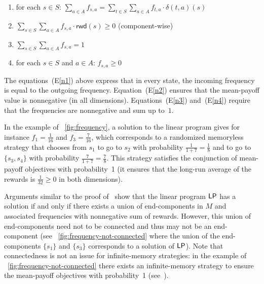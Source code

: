 \documentclass{article}
\newcommand{\PP}{\delta}
\newcommand{\LP}{{\sf LP}}
\newcommand{\rwd}{\mathsf{rwd}}
\begin{document}
\renewcommand{\theenumi}{(\arabic{enumi})}
\begin{enumerate}[(E1)]
\item for each $s \in S$: $\sum_{a \in A} f_{s,a} = \sum_{t \in S} \sum_{a \in A} f_{t,a} \cdot \PP(t,a)(s)$ \label{n1} \\[-6pt]

\item $\sum_{s \in S} \sum_{a \in A} f_{s,a} \cdot \rwd(s) \geq 0$ (component-wise) \label{n2} \\[-6pt]

\item $\sum_{s \in S} \sum_{a \in A} f_{s,a} = 1$ \label{n3} \\[-6pt]

\item for each $s \in S$ and $a \in A$: $f_{s,a} \geq 0$ \label{n4} 

\end{enumerate}
\renewcommand{\theenumi}{\arabic{enumi}}
The equations~(E\ref{n1}) above express that in every state, the incoming frequency is
equal to the outgoing frequency. Equation~(E\ref{n2}) ensures that the mean-payoff
value is nonnegative (in all dimensions). Equations~(E\ref{n3}) and~(E\ref{n4}) 
require that the frequencies are nonnegative and sum up to~$1$.

\smallskip{}
In the example of \figurename~\ref{fig:frequency}, a solution to the linear program 
gives for instance $f_1 = \frac{1}{16}$ and $f_3 = \frac{7}{16}$, which corresponds
to a randomized memoryless strategy that chooses from $s_1$ to go to $s_2$ with 
probability $\frac{1}{1+7} = \frac{1}{8}$ and to go to $\{s_3,s_4\}$ with probability
$\frac{7}{1+7} = \frac{7}{8}$. This strategy satisfies the conjunction of mean-payoff objectives 
with probability~1 (it ensures that the long-run average of the rewards is $\frac{1}{32} \geq 0$
in both dimensions).

\smallskip{}
Arguments similar to the proof of~\cite[Theorem 2.2]{KS88} show that the linear
program $\LP$ has a solution if and only if there exists a union of end-components in $M$
and associated frequencies with nonnegative sum of rewards. However, this union
of end-components need not to be connected and thus may not be an end-component
(see \figurename~\ref{fig:frequency-not-connected} where the union of 
the end-components $\{s_1\}$ and $\{s_3\}$ corresponds to a solution of $\LP$).
Note that connectedness is not an issue for infinite-memory strategies: 
in the example of \figurename~\ref{fig:frequency-not-connected} there exists 
an infinite-memory strategy to ensure the mean-payoff objectives with probability~1 
(see~\cite[Lemma~7]{VCDHRR15}).
\end{document}
